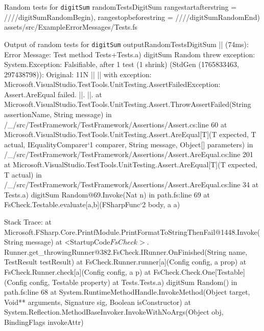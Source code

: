 \fsharpinput%
{Random tests for \texttt{digitSum}}%
{randomTestsDigitSum}%
{
	rangestartafterstring = ////digitSumRandomBegin),
	rangestopbeforestring = ////digitSumRandomEnd)
}%
{assets/src/ExampleErrorMessages/Tests.fs}




\begin{fsharpoutput}%
{Output of random tests for \texttt{digitSum}}%
{outputRandomTestsDigitSum}
|| (74ms): Error Message: Test method Tests+Tests.a) digitSum Random threw exception:
	System.Exception: Falsifiable, after 1 test (1 shrink) (StdGen (1765833463, 297438798)):
	Original:
	11N
	||
	||
	with exception:
	Microsoft.VisualStudio.TestTools.UnitTesting.AssertFailedException: Assert.AreEqual failed. ||. ||.
		at Microsoft.VisualStudio.TestTools.UnitTesting.Assert.ThrowAssertFailed(String assertionName, String message) in /_/src/TestFramework/TestFramework/Assertions/Assert.cs:line 60
		at Microsoft.VisualStudio.TestTools.UnitTesting.Assert.AreEqual[T](T expected, T actual, IEqualityComparer`1 comparer, String message, Object[] parameters) in /_/src/TestFramework/TestFramework/Assertions/Assert.AreEqual.cs:line 201
		at Microsoft.VisualStudio.TestTools.UnitTesting.Assert.AreEqual[T](T expected, T actual) in /_/src/TestFramework/TestFramework/Assertions/Assert.AreEqual.cs:line 34
		at Tests.a) digitSum Random@69.Invoke(Nat n) in path\to\Tests.fs:line 69
		at FsCheck.Testable.evaluate[a,b](FSharpFunc`2 body, a a)

	Stack Trace:
		at Microsoft.FSharp.Core.PrintfModule.PrintFormatToStringThenFail@1448.Invoke(String message)
		at <StartupCode$FsCheck>.$Runner.get_throwingRunner@382.FsCheck.IRunner.OnFinished(String name, TestResult testResult)
		at FsCheck.Runner.runner[a](Config config, a prop)
		at FsCheck.Runner.check[a](Config config, a p)
		at FsCheck.Check.One[Testable](Config config, Testable property)
		at Tests.Tests.a) digitSum Random() in path\to\Tests.fs:line 68
		at System.RuntimeMethodHandle.InvokeMethod(Object target, Void** arguments, Signature sig, Boolean isConstructor)
		at System.Reflection.MethodBaseInvoker.InvokeWithNoArgs(Object obj, BindingFlags invokeAttr)
\end{fsharpoutput}


